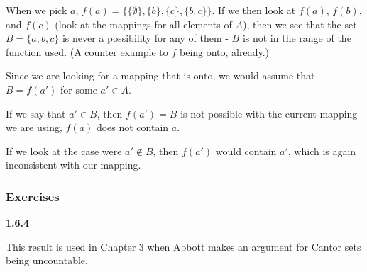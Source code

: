 When we pick $a$, $f(a) = \{ \{\emptyset\}, \{b\}, \{c\}, \{b,c\} \}$.
If we then look at $f(a)$, $f(b)$, and $f(c)$ (look at the mappings for all elements of $A$),
then we see that the set $B = \{ a, b, c \}$ is never a possibility for any of them - $B$ is
not in the range of the function used.
(A counter example to $f$ being onto, already.)

Since we are looking for a mapping that is onto, we would assume that
$B = f(a')$ for some $a' \in A$.

If we say that $a' \in B$, then $f(a') = B$ is not possible with the current mapping we are using,
$f(a)$ does not contain $a$.

If we look at the case were $a' \notin B$, then $f(a')$ would contain $a'$, which is again inconsistent
with our mapping.


\subsubsection{Exercises}

\textbf{1.6.4}

This result is used in Chapter 3 when Abbott makes an argument for Cantor sets being uncountable.

